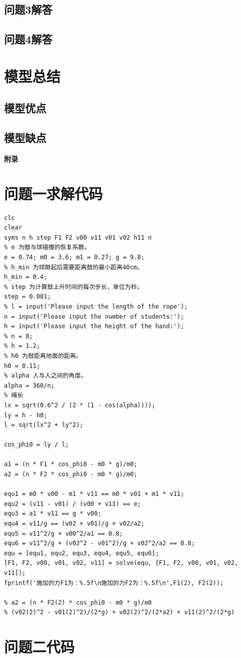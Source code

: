 \documentclass{cumcm}
\begin{document}
\subsection{问题3解答}
\subsection{问题4解答}
\section{模型总结}

\subsection{模型优点}

\subsection{模型缺点}




\begin{thebibliography}{99}
\end{thebibliography}

\newpage
\appendix
\textbf{附录}
\section{问题一求解代码}
\begin{lstlisting}
clc
clear
syms n h step F1 F2 v00 v11 v01 v02 h11 n
% e 为鼓与球碰撞的恢复系数。
e = 0.74; m0 = 3.6; m1 = 0.27; g = 9.8; 
% h_min 为球颠起后需要距离鼓的最小距离40cm。
h_min = 0.4;
% step 为计算鼓上升时间的每次步长，单位为秒。
step = 0.001;
% l = input('Please input the length of the rope');
n = input('Please input the number of students:');
h = input('Please input the height of the hand:');
% n = 8; 
% h = 1.2;
% h0 为鼓距离地面的距离。
h0 = 0.11;
% alpha 人与人之间的角度。
alpha = 360/n;
% 绳长
lx = sqrt(0.6^2 / (2 * (1 - cos(alpha))));
ly = h - h0;
l = sqrt(lx^2 + ly^2);

cos_phi0 = ly / l;

a1 = (n * F1 * cos_phi0 - m0 * g)/m0;
a2 = (n * F2 * cos_phi0 - m0 * g)/m0;

equ1 = m0 * v00 - m1 * v11 == m0 * v01 + m1 * v11;
equ2 = (v11 - v01) / (v00 + v11) == e;
equ3 = a1 * v11 == g * v00;
equ4 = v11/g == (v02 + v01)/g + v02/a2;
equ5 = v11^2/g + v00^2/a1 == 0.8;
equ6 = v11^2/g + (v02^2 - v01^2)/g + v02^2/a2 == 0.8;
equ = [equ1, equ2, equ3, equ4, equ5, equ6];
[F1, F2, v00, v01, v02, v11] = solve(equ, [F1, F2, v00, v01, v02, v11]);
fprintf('施加的力F1为：%.5f\n施加的力F2为：%.5f\n',F1(2), F2(2));

% a2 = (n * F2(2) * cos_phi0 - m0 * g)/m0
% (v02(2)^2 - v01(2)^2)/(2*g) + v02(2)^2/(2*a2) + v11(2)^2/(2*g)
\end{lstlisting}

\section{问题二代码}
\begin{lstlisting}
\end{lstlisting}
\end{document}
